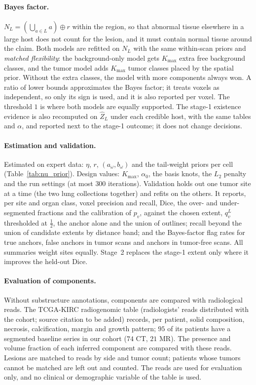 \documentclass[fleqn,10pt]{olplainarticle}
\begin{document}
\paragraph{Bayes factor.} $N_L=(\bigcup_{a\in L}a)\oplus r$ within the region, so that abnormal tissue elsewhere in a large
host does not count for the lesion, and it must contain normal tissue around the claim. Both models are refitted on $N_L$
with the same within-scan priors and \emph{matched flexibility}: the background-only model gets $K_{\max}$ extra free
background classes, and the tumor model adds $K_{\max}$ tumor classes placed by the spatial prior. Without the extra classes,
the model with more components always won. A ratio of lower bounds approximates the Bayes factor; it treats voxels as
independent, so only its sign is used, and it is also reported per voxel. The threshold $1$ is where both models are equally
supported. The stage-1 existence evidence is also recomputed on $\hat Z_L$ under each credible host, with the same tables and
$\alpha$, and reported next to the stage-1 outcome; it does not change decisions.

\paragraph{Estimation and validation.} Estimated on expert data: $\eta$, $r$, $(a_\omega,b_\omega)$ and the tail-weight
priors per cell (Table~\ref{tab:nu_prior}).
Design values: $K_{\max}$, $\alpha_0$, the basis knots, the $L_2$ penalty and the run settings (at most $300$ iterations).
Validation holds out one tumor site at a time (the two lung collections together) and refits on the others. It reports, per
site and organ class, voxel precision and recall, Dice, the over- and under-segmented fractions and the calibration of
$p_v$, against the chosen extent, $q^L_v$ thresholded at $\tfrac12$, the anchor alone and the union of outlines; recall beyond
the union of candidate extents by distance band; and the Bayes-factor flag rates for true anchors, false anchors in tumor
scans and anchors in tumor-free scans. All summaries weight sites equally. Stage~2 replaces the stage-1 extent only where it
improves the held-out Dice.

\paragraph{Evaluation of components.} Without substructure annotations, components are compared with radiological reads.
The TCGA-KIRC radiogenomic table (radiologists' reads distributed with the cohort; source citation to be added) records, per
patient, solid composition, necrosis, calcification, margin and growth pattern; $95$ of its patients have a segmented
baseline series in our cohort ($74$ CT, $21$ MR). The presence and volume fraction of each inferred component are compared
with these reads. Lesions are matched to reads by side and tumor count; patients whose tumors cannot be matched are left out
and counted. The reads are used for evaluation only, and no clinical or demographic variable of the table is used.
\end{document}
